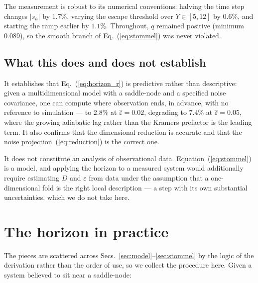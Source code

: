 \documentclass[%
 aip,
 cha,
 amsmath,amssymb,
 reprint,
 superscriptaddress,
 floatfix,
]{revtex4-2}
\newcommand{\Sig}{\hat\varepsilon}
\begin{document}
The measurement is robust to its numerical conventions: halving the time step changes $|s_h|$ by $1.7\%$, varying the escape threshold over $Y\in[5,12]$ by $0.6\%$, and starting the ramp earlier by $1.1\%$.  Throughout, $q$ remained positive (minimum $0.089$), so the smooth branch of Eq.~(\ref{eq:stommel}) was never violated.

\subsection{What this does and does not establish}

It establishes that Eq.~(\ref{eq:horizon_r}) is predictive rather than descriptive: given a multidimensional model with a saddle-node and a specified noise covariance, one can compute where observation ends, in advance, with no reference to simulation --- to $2.8\%$ at $\Sig=0.02$, degrading to $7.4\%$ at $\Sig=0.05$, where the growing adiabatic lag rather than the Kramers prefactor is the leading term.  It also confirms that the dimensional reduction is accurate and that the noise projection~(\ref{eq:reduction}) is the correct one.

It does not constitute an analysis of observational data.  Equation~(\ref{eq:stommel}) is a model, and applying the horizon to a measured system would additionally require estimating $D$ and $\varepsilon$ from data under the assumption that a one-dimensional fold is the right local description --- a step with its own substantial uncertainties, which we do not take here.

\section{\label{sec:recipe}The horizon in practice}

The pieces are scattered across Secs.~\ref{sec:model}--\ref{sec:stommel} by the
logic of the derivation rather than the order of use, so we collect the
procedure here.  Given a system believed to sit near a saddle-node:
\end{document}
